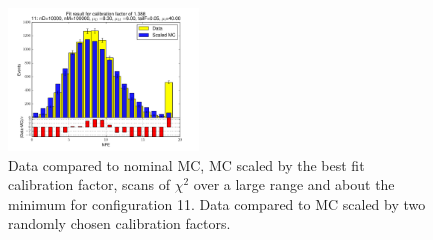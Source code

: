 \begin{figure}[htbp]
\begin{center}
\includegraphics[width=0.45\textwidth]{../FIGURES/11/FIG_Fit_result_for_calibration_factor_of_1_388.pdf} 
\caption{Data compared to nominal MC, MC scaled by the best fit calibration factor, scans of $\chi^2$ over a large range and about the minimum for configuration 11. Data compared to MC scaled by two randomly chosen calibration factors.} 
\label{tab:best_11} 
\end{center} \end{figure} 

